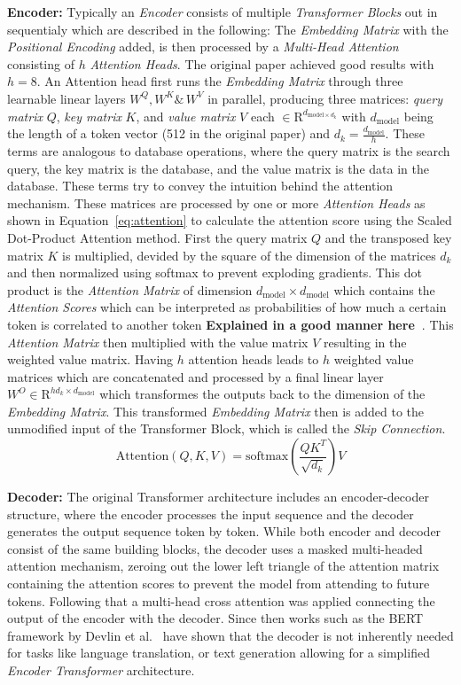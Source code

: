 \textbf{Encoder:} Typically an \emph{Encoder} consists of multiple \emph{Transformer Blocks} out in sequentialy which are described in the following: The \emph{Embedding Matrix} with the \emph{Positional Encoding} added, is then processed by a \emph{Multi-Head Attention} consisting of $h$ \emph{Attention Heads}.
The original paper achieved good results with $h=8$.
An Attention head first runs the \emph{Embedding Matrix} through three learnable linear layers $W^Q, W^K \&\, W^V$ in parallel, producing three matrices: \emph{query matrix} $Q$, \emph{key matrix} $K$, and \emph{value matrix} $V$ each $\in \mathrm{R}^{d_{\text{model}\times d_k}}$ with $d_{\text{model}}$ being the length of a token vector (512 in the original paper) and $d_k = \frac{d_{\text{model}}}{h}$. 
These terms are analogous to database operations, where the query matrix is the search query, the key matrix is the database, and the value matrix is the data in the database. 
These terms try to convey the intuition behind the attention mechanism.
These matrices are processed by one or more \emph{Attention Heads} as shown in Equation~\ref{eq:attention} to calculate the attention score using the Scaled Dot-Product Attention method. 
First the query matrix $Q$ and the transposed key matrix $K$ is multiplied, devided by the square of the dimension of the matrices $d_k$ and then normalized using softmax to prevent exploding gradients.
This dot product is the \emph{Attention Matrix} of dimension $d_{\text{model}}\times d_{\text{model}}$ which contains the \emph{Attention Scores} which can be interpreted as probabilities of how much a certain token is correlated to another token \textbf{Explained in a good manner here~\cite{Han2023}}. 
This \emph{Attention Matrix} then multiplied with the value matrix $V$ resulting in the weighted value matrix.
Having $h$ attention heads leads to $h$ weighted value matrices which are concatenated and processed by a final linear layer $W^O \in \mathrm{R}^{hd_k \times d_{\text{model}}}$ which transformes the outputs back to the dimension of the \emph{Embedding Matrix}.
This transformed \emph{Embedding Matrix} then is added to the unmodified input of the Transformer Block, which is called the \emph{Skip Connection}.     
\begin{equation}
    \text{Attention}(Q, K, V) = \text{softmax}\left(\frac{QK^{T}}{\sqrt{d_{k}}}\right)V
    \label{eq:attention}
\end{equation}

\textbf{Decoder:} The original Transformer architecture includes an encoder-decoder structure, where the encoder processes the input sequence and the decoder generates the output sequence token by token. While both encoder and decoder consist of the same building blocks, the decoder uses a masked multi-headed attention mechanism, zeroing out the lower left triangle of the attention matrix containing the attention scores to prevent the model from attending to future tokens. 
Following that a multi-head cross attention was applied connecting the output of the encoder with the decoder.
Since then works such as the BERT framework by Devlin et al.~\cite{Devlin2018} have shown that the decoder is not inherently needed for tasks like language translation, or text generation allowing for a simplified \emph{Encoder Transformer} architecture.


